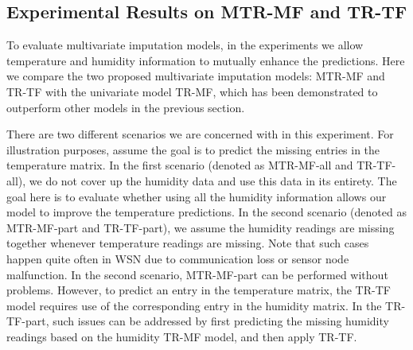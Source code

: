 \subsection{Experimental Results on MTR-MF and TR-TF}




To evaluate multivariate imputation models, in the experiments we allow temperature and humidity information to mutually enhance the predictions.
Here we compare the two proposed multivariate imputation models: MTR-MF and TR-TF with the univariate model TR-MF, which has been demonstrated to outperform other models in the previous section. 

There are two different scenarios we are concerned with in this experiment.
For illustration purposes, assume the goal is to predict the missing entries in the temperature matrix.
In the first scenario (denoted as MTR-MF-all and TR-TF-all), we do not cover up the humidity data and use this data in its entirety.
The goal here is to evaluate whether using all the humidity information allows our model to improve the temperature predictions.
In the second scenario (denoted as MTR-MF-part and TR-TF-part), we assume the humidity readings are missing together whenever temperature readings are missing.
Note that such cases happen quite often in WSN due to communication loss or sensor node malfunction.
In the second scenario, MTR-MF-part can be performed without problems.
However, to predict an entry in the temperature matrix, the TR-TF model requires use of the corresponding entry in the humidity matrix.
In the TR-TF-part, such issues can be addressed by first predicting the missing humidity readings based on the humidity TR-MF model, and then apply TR-TF.


